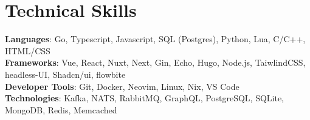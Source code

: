 \documentclass[letterpaper,11pt]{article}
\begin{document}
\section{Technical Skills}
 \begin{itemize}[leftmargin=0.15in, label={}]
    \small{\item{
     \textbf{Languages}{: Go, Typescript, Javascript, SQL (Postgres), Python, Lua, C/C++, HTML/CSS} \\
     \textbf{Frameworks}{: Vue, React, Nuxt, Next, Gin, Echo, Hugo, Node.js, TaiwlindCSS, headless-UI, Shadcn/ui, flowbite} \\
     \textbf{Developer Tools}{: Git, Docker, Neovim, Linux, Nix, VS Code} \\
     \textbf{Technologies}{: Kafka, NATS, RabbitMQ, GraphQL, PostgreSQL, SQLite, MongoDB, Redis, Memcached} \\
    }}
 \end{itemize}


\end{document}
